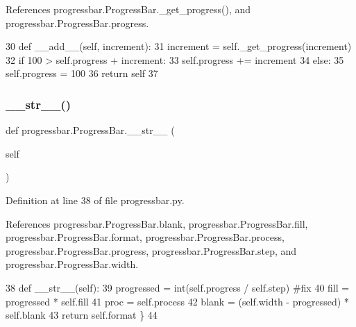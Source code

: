 References progressbar.\+Progress\+Bar.\+\_\+get\+\_\+progress(), and progressbar.\+Progress\+Bar.\+progress.


\begin{DoxyCode}
30     \textcolor{keyword}{def }\_\_add\_\_(self, increment):
31         increment = self.\_get\_progress(increment)
32         \textcolor{keywordflow}{if} 100 > self.progress + increment:
33             self.progress += increment
34         \textcolor{keywordflow}{else}:
35             self.progress = 100
36         \textcolor{keywordflow}{return} self
37     
\end{DoxyCode}
\mbox{\label{classprogressbar_1_1ProgressBar_aea02b9e37516e9d267e2d48b4e415bd8}} 
\subsubsection{\texorpdfstring{\+\_\+\+\_\+str\+\_\+\+\_\+()}{\_\_str\_\_()}}
{\footnotesize\ttfamily def progressbar.\+Progress\+Bar.\+\_\+\+\_\+str\+\_\+\+\_\+ (\begin{DoxyParamCaption}\item[{}]{self }\end{DoxyParamCaption})}



Definition at line 38 of file progressbar.\+py.



References progressbar.\+Progress\+Bar.\+blank, progressbar.\+Progress\+Bar.\+fill, progressbar.\+Progress\+Bar.\+format, progressbar.\+Progress\+Bar.\+process, progressbar.\+Progress\+Bar.\+progress, progressbar.\+Progress\+Bar.\+step, and progressbar.\+Progress\+Bar.\+width.


\begin{DoxyCode}
38     \textcolor{keyword}{def }\_\_str\_\_(self):
39         progressed = int(self.progress / self.step) \textcolor{comment}{#fix}
40         fill = progressed * self.fill
41         proc = self.process
42         blank = (self.width - progressed) * self.blank
43         \textcolor{keywordflow}{return} self.format %
      \}
44 
\end{DoxyCode}
\mbox{\label{classprogressbar_1_1ProgressBar_a8e8704c0f26d529f82413318cc9e9c81}} 
